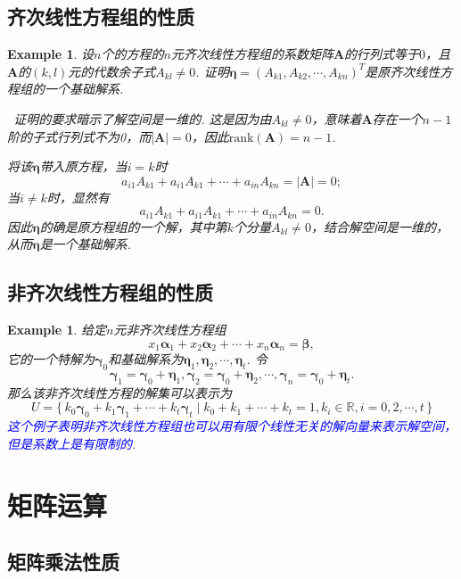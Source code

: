 \documentclass{article}
\newtheorem{example}[theorem]{Example}
\newcommand\Set[2]{\{\,#1\mid#2\,\}} %
\newcommand{\hints}{{\color{blue} \text{hints}}}
\newcommand{\mbf}[1]{\bm{#1}}
\newcommand{\rank}[1]{\text{rank}\left(#1\right)} %
\newcommand{\bluet}[1]{\textcolor{blue}{#1}}
\begin{document}
\subsection{齐次线性方程组的性质}

\begin{example}
\rm 设$n$个的方程的$n$元齐次线性方程组的系数矩阵$\mbf{A}$的行列式等于$0$，且$\mbf{A}$的$(k,l)$元的代数余子式$A_{kl} \neq 0$. 证明$\mbf{\eta}=(A_{k1},A_{k2},\cdots,A_{kn})^T$是原齐次线性方程组的一个基础解系. 

\hints\ 证明的要求暗示了解空间是一维的. 这是因为由$A_{kl} \neq 0$，意味着$\mbf{A}$存在一个$n-1$阶的子式行列式不为0，而$|\mbf{A}| = 0$，因此$\rank{\mbf{A}} = n-1$. 

将该$\mbf{\eta}$带入原方程，当$i = k$时
$$
a_{i1}A_{k1} + a_{i1}A_{k1} +\cdots +a_{in}A_{kn} = |\mbf{A}| = 0; 
$$
当$i \neq k$时，显然有
$$
a_{i1}A_{k1} + a_{i1}A_{k1} +\cdots +a_{in}A_{kn} = 0.
$$
因此$\mbf{\eta}$的确是原方程组的一个解，其中第$k$个分量$A_{kl} \neq 0$，结合解空间是一维的，从而$\mbf{\eta}$是一个基础解系. 
\end{example}

\subsection{非齐次线性方程组的性质}

\begin{example}
\rm 给定$n$元非齐次线性方程组
$$
x_1\mbf{\alpha}_1 + x_2\mbf{\alpha}_2 + \cdots + x_n\mbf{\alpha}_n = \mbf{\beta},
$$
它的一个特解为$\mbf{\gamma}_0$和基础解系为$\mbf{\eta}_1,\mbf{\eta}_2,\cdots,\mbf{\eta}_t$. 令
$$
\mbf{\gamma}_1 = \mbf{\gamma}_0 + \mbf{\eta}_1, \mbf{\gamma}_2 = \mbf{\gamma}_0 + \mbf{\eta}_2,\cdots,\mbf{\gamma}_n = \mbf{\gamma}_0 + \mbf{\eta}_t.
$$
那么该非齐次线性方程的解集可以表示为
$$
U = \Set{k_0\mbf{\gamma}_0+k_1\mbf{\gamma}_1+\cdots+k_t\mbf{\gamma}_t}{k_0 + k_1 + \cdots + k_t = 1, k_i \in \mathbb{R},i =0,2,\cdots,t}
$$
\bluet{这个例子表明非齐次线性方程组也可以用有限个线性无关的解向量来表示解空间，但是系数上是有限制的}.
\end{example}

\newpage
\section{矩阵运算}

\subsection{矩阵乘法性质}
\end{document}
